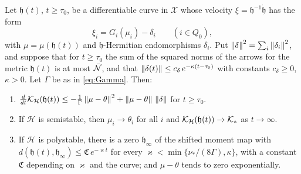 \begin{proposition}\label{prop:perturbed}
Let $\mathfrak h(t)$, $t\geq\tau_0$, be a differentiable curve in $\mathcal X$
whose velocity $\xi=\mathfrak h^{-1}\dot{\mathfrak h}$ has the form
\[
 \xi_i=G_i(\mu_i)-\delta_i\qquad(i\in Q_0),
\]
with $\mu=\mu(\mathfrak h(t))$ and $\mathfrak h$-Hermitian endomorphisms
$\delta_i$. Put $\left\lVert\delta\right\rVert^2=\sum_i\left\lVert\delta_i\right\rVert^2$, and suppose that for
$t\geq\tau_0$ the sum of the squared norms of the arrows for the metric
$\mathfrak h(t)$ is at most $\bar{\mathcal N}$, and that
$\left\lVert\delta(t)\right\rVert\leq c_\delta\,e^{-\kappa(t-\tau_0)}$ with constants
$c_\delta\geq0$, $\kappa>0$. Let $\Gamma$ be as in \eqref{eq:Gamma}. Then:
\begin{enumerate}
\item[(i)] $\frac d{dt}\mathcal K_{\mathcal H}(\mathfrak h(t))
 \leq-\frac1\Gamma\left\lVert\mu-\theta\right\rVert^2+\left\lVert\mu-\theta\right\rVert\,\left\lVert\delta\right\rVert$ for
 $t\geq\tau_0$.
\item[(ii)] If $\mathcal H$ is semistable, then $\mu_i\to\theta_i$ for all
 $i$ and $\mathcal K_{\mathcal H}(\mathfrak h(t))\to\mathcal K_*$ as $t\to\infty$.
\item[(iii)] If $\mathcal H$ is polystable, there is a zero
 $\mathfrak h_\infty$ of the shifted moment map with
 $d(\mathfrak h(t),\mathfrak h_\infty)\leq\mathfrak C\,e^{-\varkappa t}$ for
 every $\varkappa<\min\{\nu_*/(8\Gamma),\kappa\}$, with a constant
 $\mathfrak C$ depending on $\varkappa$ and the curve; and $\mu-\theta$ tends
 to zero exponentially.
\end{enumerate}
\end{proposition}

